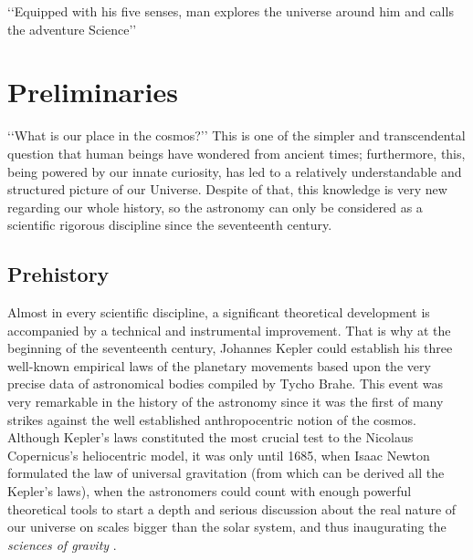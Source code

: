 \begin{savequote}[50mm]
‘‘Equipped with his five senses, man explores the universe around him and 
calls the adventure Science’’
\end{savequote}




\chapter{Preliminaries}
\label{cha:Introduction}


‘‘What is our place in the cosmos?’’ This is one of the simpler and 
trans\-cendental question that human beings have wondered from ancient 
times; furthermore, this, being powered by our innate curiosity, has led to 
a relatively understandable and structured picture of our Universe. Despite 
of that, this knowledge is very new regarding our whole history, so the 
astronomy can only be considered as a scientific rigorous discipline since 
the seventeenth century.







\section{Prehistory}
\label{sec:Prehistory}


Almost in every scientific discipline, a significant theoretical development 
is accompanied by a technical and instrumental improvement. That is why at 
the beginning of the seventeenth century, Johannes Kepler could establish 
his three well-known empirical laws of the planetary movements based upon 
the very precise data of astronomical bodies compiled by Tycho Brahe. This 
event was very remarkable in the history of the astronomy since it was the 
first of many strikes against the well established anthropocentric notion 
of the cosmos. Although Kepler's laws constituted the most crucial test to 
the Nicolaus Copernicus's heliocentric model, it was only until 1685, when 
Isaac Newton formulated the law of universal gravitation (from which can be 
derived all the Kepler's laws), when the astronomers could count with 
enough powerful theoretical tools to start a depth and serious discussion 
about the real nature of our universe on scales bigger than the solar 
system, and thus inaugurating the \textit{sciences of gravity} 
\cite{longair2008}.


